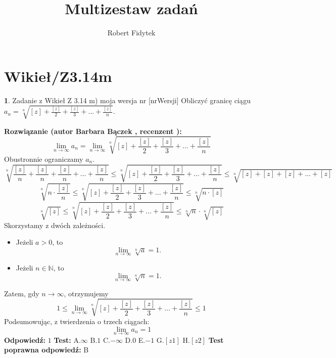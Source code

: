 \documentclass[12pt, a4paper]{article}
\title{Multizestaw zadań}
\author{Robert Fidytek}
\date{}
\theoremstyle{definition} %
\newtheorem{zad}{}
\newcommand{\kategoria}[1]{\section{#1}} %
\newcommand{\zadStart}[1]{\begin{zad}#1\newline} %
\newcommand{\zadStop}{\end{zad}}   %
\newcommand{\rozwStart}[2]{\noindent \textbf{Rozwiązanie (autor #1 , recenzent #2): }\newline} %
\newcommand{\rozwStop}{\newline}                                            %
\newcommand{\odpStart}{\noindent \textbf{Odpowiedź:}\newline}    %
\newcommand{\odpStop}{\newline}                                             %
\newcommand{\testStart}{\noindent \textbf{Test:}\newline} %
\newcommand{\testStop}{\newline} %
\newcommand{\kluczStart}{\noindent \textbf{Test poprawna odpowiedź:}\newline} %
\newcommand{\kluczStop}{\newline} %
\begin{document}
\maketitle


\kategoria{Wikieł/Z3.14m}
\zadStart{Zadanie z Wikieł Z 3.14 m) moja wersja nr [nrWersji]}
Obliczyć granicę ciągu $a_n= \sqrt[n]{[z]+\frac{[z]}{2} + \frac{[z]}{3}+ \ldots + \frac{[z]}{n}}$.
\zadStop
\rozwStart{Barbara Bączek}{}
$$\lim_{n \rightarrow \infty} a_n= \lim_{n \rightarrow \infty} \sqrt[n]{[z]+\frac{[z]}{2} + \frac{[z]}{3}+ \ldots + \frac{[z]}{n}}$$
Obustronnie ograniczamy $a_n$. 
$$ \sqrt[n]{\frac{[z]}{n}+ \frac{[z]}{n} +  \frac{[z]}{n}+ \ldots + \frac{[z]}{n}}  \leq \sqrt[n]{[z]+\frac{[z]}{2} + \frac{[z]}{3}+ \ldots + \frac{[z]}{n}} \leq \sqrt[n]{[z]+ [z] + [z]+ \ldots + [z]} $$
$$ \sqrt[n]{n \cdot \frac{[z]}{n}}  \leq \sqrt[n]{[z]+\frac{[z]}{2} + \frac{[z]}{3}+ \ldots + \frac{[z]}{n}} \leq \sqrt[n]{n \cdot [z]}$$
$$\sqrt[n]{[z]}  \leq \sqrt[n]{[z]+\frac{[z]}{2} + \frac{[z]}{3}+ \ldots + \frac{[z]}{n}} \leq \sqrt[n]{n} \cdot \sqrt[n]{[z]}$$
Skorzystamy z dwóch zależności.
\begin{itemize}
\item Jeżeli $a>0$, to $$\lim_{n \rightarrow \infty} \sqrt[n]{a}=1.$$
\item Jeżeli $n \in \mathbb{N}$, to $$\lim_{n \rightarrow \infty} \sqrt[n]{n}=1.$$
\end{itemize}
Zatem, gdy $n \rightarrow \infty$, otrzymujemy
$$ 1 \leq \lim_{n \rightarrow \infty}  \sqrt[n]{[z]+\frac{[z]}{2} + \frac{[z]}{3}+ \ldots + \frac{[z]}{n}} \leq 1$$
Podsumowując, z twierdzenia o trzech ciągach:  $$\lim_{n \rightarrow \infty} a_n= 1$$
\rozwStop
\odpStart
$1$
\odpStop
\testStart
A.$\infty$
B.$1$
C.$-\infty$
D.$0$
E.$-1$
G.$[z1]$
H.$[z2]$
\testStop
\kluczStart
B
\kluczStop
\end{document}
